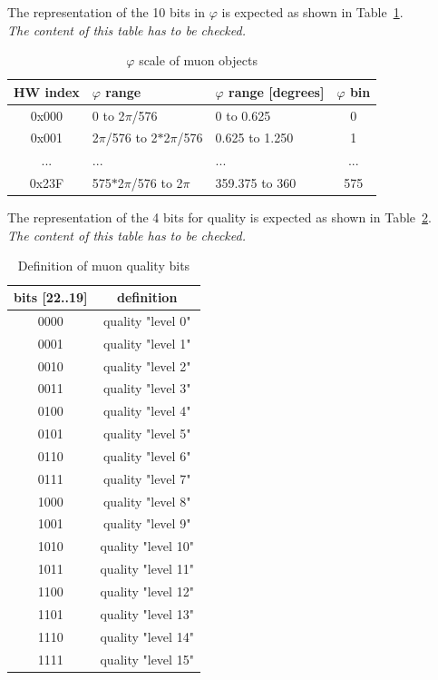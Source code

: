 The representation of the 10 bits in $\varphi$ is expected as shown in Table~\ref{tab:gtl:muon_phi_scale}.\\
\textit{The content of this table has to be checked.}
 
\begin{table}[htdp]
\begin{center}
\begin{tabular}{|c|l|l|c|}\hline
HW index & $\varphi$ range & $\varphi$ range [degrees] & $\varphi$ bin\\\hline\hline
0x000 & 0 to 2$\pi$/576 & 0 to 0.625 & 0\\\hline
0x001 & 2$\pi$/576 to 2$*$2$\pi$/576 & 0.625 to 1.250 & 1\\\hline
... & ... & ... & ...\\\hline
0x23F & 575$*$2$\pi$/576 to 2$\pi$ & 359.375 to 360 & 575\\\hline
\end{tabular}
\end{center}
\caption{$\varphi$ scale of muon objects}
\label{tab:gtl:muon_phi_scale}
\end{table}

The representation of the 4 bits for quality is expected as shown in Table~\ref{tab:gtl:muon_quality_bits}.\\
\textit{The content of this table has to be checked.}
 
\begin{table}[ht]
\caption{Definition of muon quality bits}
\vspace{5mm}
\centering
\begin{tabular}{|c|c|}\hline
bits [22..19] & definition \\\hline\hline
0000 & quality "level 0" \\
0001 & quality "level 1" \\
0010 & quality "level 2" \\
0011 & quality "level 3" \\
0100 & quality "level 4" \\
0101 & quality "level 5" \\
0110 & quality "level 6" \\
0111 & quality "level 7" \\
1000 & quality "level 8" \\
1001 & quality "level 9" \\
1010 & quality "level 10" \\
1011 & quality "level 11" \\
1100 & quality "level 12" \\
1101 & quality "level 13" \\
1110 & quality "level 14" \\
1111 & quality "level 15" \\\hline
\end{tabular}
\label{tab:gtl:muon_quality_bits}
\end{table}

